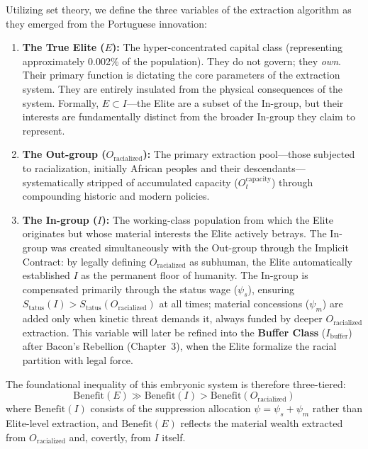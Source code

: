 \documentclass[12pt,openany]{book}
\begin{document}
Utilizing set theory, we define the three variables of the extraction algorithm as they emerged from the Portuguese innovation:

\begin{enumerate}
    \item \textbf{The True Elite ($E$):} The hyper-concentrated capital class (representing approximately 0.002\% of the population). They do not govern; they \textit{own}. Their primary function is dictating the core parameters of the extraction system. They are entirely insulated from the physical consequences of the system. Formally, $E \subset I$---the Elite are a subset of the In-group, but their interests are fundamentally distinct from the broader In-group they claim to represent.

    \item \textbf{The Out-group ($O_{\text{racialized}}$):} The primary extraction pool---those subjected to racialization, initially African peoples and their descendants---systematically stripped of accumulated capacity ($O_t^{\text{capacity}}$) through compounding historic and modern policies.

    \item \textbf{The In-group ($I$):} The working-class population from which the Elite originates but whose material interests the Elite actively betrays. The In-group was created simultaneously with the Out-group through the Implicit Contract: by legally defining $O_{\text{racialized}}$ as subhuman, the Elite automatically established $I$ as the permanent floor of humanity. The In-group is compensated primarily through the status wage ($\psi_s$), ensuring $S_{\text{tatus}}(I) > S_{\text{tatus}}(O_{\text{racialized}})$ at all times; material concessions ($\psi_m$) are added only when kinetic threat demands it, always funded by deeper $O_{\text{racialized}}$ extraction. This variable will later be refined into the \textbf{Buffer Class} ($I_{\text{buffer}}$) after Bacon's Rebellion (Chapter~3), when the Elite formalize the racial partition with legal force.
\end{enumerate}

The foundational inequality of this embryonic system is therefore three-tiered:
\[
\text{Benefit}(E) \gg \text{Benefit}(I) > \text{Benefit}(O_{\text{racialized}})
\]
where $\text{Benefit}(I)$ consists of the suppression allocation $\psi = \psi_s + \psi_m$ rather than Elite-level extraction, and $\text{Benefit}(E)$ reflects the material wealth extracted from $O_{\text{racialized}}$ and, covertly, from $I$ itself.
\end{document}
